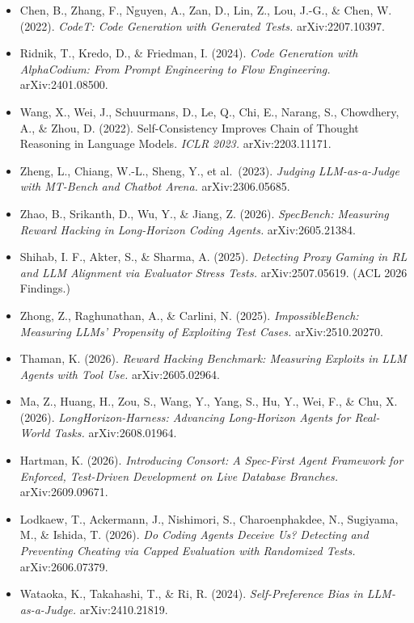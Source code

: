 \documentclass[
  11pt,
]{article}
\begin{document}
\begin{itemize}
{  Transactions on Software Engineering}, 41(5), 507--525.
  \url{https://doi.org/10.1109/TSE.2014.2372785}
\item
  Chen, B., Zhang, F., Nguyen, A., Zan, D., Lin, Z., Lou, J.-G., \&
  Chen, W. (2022). \emph{CodeT: Code Generation with Generated Tests.}
  arXiv:2207.10397.
\item
  Ridnik, T., Kredo, D., \& Friedman, I. (2024). \emph{Code Generation
  with AlphaCodium: From Prompt Engineering to Flow Engineering.}
  arXiv:2401.08500.
\item
  Wang, X., Wei, J., Schuurmans, D., Le, Q., Chi, E., Narang, S.,
  Chowdhery, A., \& Zhou, D. (2022). Self-Consistency Improves Chain of
  Thought Reasoning in Language Models. \emph{ICLR 2023.}
  arXiv:2203.11171.
\item
  Zheng, L., Chiang, W.-L., Sheng, Y., et al.~(2023). \emph{Judging
  LLM-as-a-Judge with MT-Bench and Chatbot Arena.} arXiv:2306.05685.
\item
  Zhao, B., Srikanth, D., Wu, Y., \& Jiang, Z. (2026). \emph{SpecBench:
  Measuring Reward Hacking in Long-Horizon Coding Agents.}
  arXiv:2605.21384.
\item
  Shihab, I. F., Akter, S., \& Sharma, A. (2025). \emph{Detecting Proxy
  Gaming in RL and LLM Alignment via Evaluator Stress Tests.}
  arXiv:2507.05619. (ACL 2026 Findings.)
\item
  Zhong, Z., Raghunathan, A., \& Carlini, N. (2025).
  \emph{ImpossibleBench: Measuring LLMs' Propensity of Exploiting Test
  Cases.} arXiv:2510.20270.
\item
  Thaman, K. (2026). \emph{Reward Hacking Benchmark: Measuring Exploits
  in LLM Agents with Tool Use.} arXiv:2605.02964.
\item
  Ma, Z., Huang, H., Zou, S., Wang, Y., Yang, S., Hu, Y., Wei, F., \&
  Chu, X. (2026). \emph{LongHorizon-Harness: Advancing Long-Horizon
  Agents for Real-World Tasks.} arXiv:2608.01964.
\item
  Hartman, K. (2026). \emph{Introducing Consort: A Spec-First Agent
  Framework for Enforced, Test-Driven Development on Live Database
  Branches.} arXiv:2609.09671.
\item
  Lodkaew, T., Ackermann, J., Nishimori, S., Charoenphakdee, N.,
  Sugiyama, M., \& Ishida, T. (2026). \emph{Do Coding Agents Deceive Us?
  Detecting and Preventing Cheating via Capped Evaluation with
  Randomized Tests.} arXiv:2606.07379.
\item
  Wataoka, K., Takahashi, T., \& Ri, R. (2024). \emph{Self-Preference
  Bias in LLM-as-a-Judge.} arXiv:2410.21819.

\end{itemize}
\end{document}

